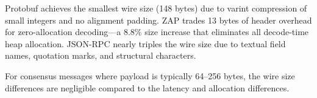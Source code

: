 Protobuf achieves the smallest wire size (148 bytes) due to varint compression of small integers and no alignment padding. ZAP trades 13 bytes of header overhead for zero-allocation decoding---a 8.8\% size increase that eliminates all decode-time heap allocation. JSON-RPC nearly triples the wire size due to textual field names, quotation marks, and structural characters.

For consensus messages where payload is typically 64--256 bytes, the wire size differences are negligible compared to the latency and allocation differences.

